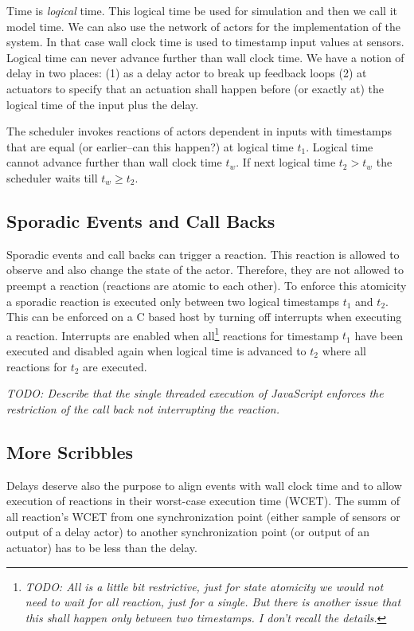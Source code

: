 \documentclass[sigconf]{acmart}
\newcommand{\todo}[1]{{\emph{TODO: #1}}}
\begin{document}
Time is \emph{logical} time. This logical time be used for simulation and then
we call it model time. We can also use the network of actors for the implementation
of the system. In that case wall clock time is used to timestamp input values
at sensors. Logical time can never advance further than wall clock time.
We have a notion of delay in two places: (1) as a delay actor to break up
feedback loops (2) at actuators to specify that an actuation shall happen before
(or exactly at) the logical time of the input plus the delay.

The scheduler invokes reactions of actors dependent in inputs with timestamps
that are equal (or earlier--can this happen?) at logical time $t_1$.
Logical time cannot advance further than wall clock time $t_w$. If next logical
time $t_2 > t_w$ the scheduler waits till $t_w \ge t_2$.

\subsection{Sporadic Events and Call Backs}

Sporadic events and call backs can trigger a reaction. This reaction is allowed
to observe and also change the state of the actor. Therefore, they are not allowed
to preempt a reaction (reactions are atomic to each other). To enforce this atomicity
a sporadic reaction is executed only between two logical timestamps $t_1$ and $t_2$.
This can be enforced on a C based host by turning off interrupts when executing
a reaction. Interrupts are enabled when all\footnote{\todo{All is a little bit restrictive,
just for state atomicity we would not need to wait for all reaction, just for a single.
But there is another issue that this shall happen only between two timestamps.
I don't recall the details.}}
reactions for timestamp $t_1$ have been executed and disabled again when logical
time is advanced to $t_2$ where all reactions for $t_2$ are executed.


\todo{Describe that the single threaded execution of JavaScript enforces
the restriction of the call back not interrupting the reaction.}

\subsection{More Scribbles}

Delays deserve also the purpose to align events with wall clock time and to
allow execution of reactions in their worst-case execution time (WCET).
The summ of all reaction's WCET from one synchronization point (either
sample of sensors or output of a delay actor) to another synchronization
point (or output of an actuator) has to be less than the delay.
\end{document}
